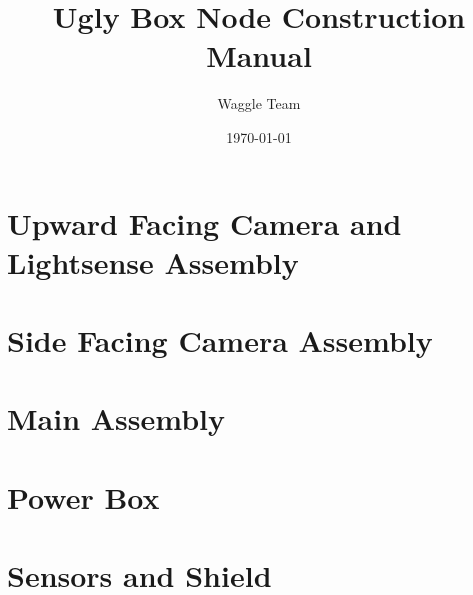 \documentclass{article}
\title{Ugly Box Node Construction Manual}
\author{Waggle Team}
\date{\today}
\begin{document}
\maketitle

\newpage

\section{Upward Facing Camera and Lightsense Assembly}

\clearpage

\section{Side Facing Camera Assembly}

\clearpage

\section{Main Assembly}

\clearpage

\section{Power Box}

\clearpage

\section{Sensors and Shield}

\clearpage
\end{document}
